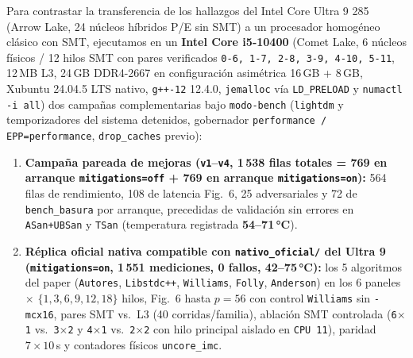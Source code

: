 \documentclass[11pt,a4paper]{article}
\begin{document}
Para contrastar la transferencia de los hallazgos del Intel Core Ultra 9 285 (Arrow Lake, 24 núcleos híbridos P/E sin SMT) a un procesador homogéneo clásico con SMT, ejecutamos en un \textbf{Intel Core i5-10400} (Comet Lake, 6 núcleos físicos / 12 hilos SMT con pares verificados \texttt{0-6, 1-7, 2-8, 3-9, 4-10, 5-11}, 12\,MB L3, 24\,GB DDR4-2667 en configuración asimétrica 16\,GB + 8\,GB, Xubuntu 24.04.5 LTS nativo, \texttt{g++-12} 12.4.0, \texttt{jemalloc} vía \texttt{LD\_PRELOAD} y \texttt{numactl -i all}) dos campañas complementarias bajo \texttt{modo-bench} (\texttt{lightdm} y temporizadores del sistema detenidos, gobernador \texttt{performance / EPP=performance}, \texttt{drop\_caches} previo):
\begin{enumerate}
  \item \textbf{Campaña pareada de mejoras (\texttt{v1}--\texttt{v4}, 1\,538 filas totales = 769 en arranque \texttt{mitigations=off} + 769 en arranque \texttt{mitigations=on}):} 564 filas de rendimiento, 108 de latencia Fig.~6, 25 adversariales y 72 de \texttt{bench\_basura} por arranque, precedidas de validación sin errores en \texttt{ASan+UBSan} y \texttt{TSan} (temperatura registrada \textbf{54--71\,°C}).
  \item \textbf{Réplica oficial nativa compatible con \texttt{nativo\_oficial/} del Ultra 9 (\texttt{mitigations=on}, 1\,551 mediciones, 0 fallos, 42--75\,°C):} los 5 algoritmos del paper (\texttt{Autores}, \texttt{Libstdc++}, \texttt{Williams}, \texttt{Folly}, \texttt{Anderson}) en los 6 paneles $\times$ $\{1, 3, 6, 9, 12, 18\}$ hilos, Fig.~6 hasta $p=56$ con control \texttt{Williams} sin \texttt{-mcx16}, pares SMT vs.\ L3 (40 corridas/familia), ablación SMT controlada (\texttt{6$\times$1} vs.\ \texttt{3$\times$2} y \texttt{4$\times$1} vs.\ \texttt{2$\times$2} con hilo principal aislado en \texttt{CPU 11}), paridad $7\times 10$\,s y contadores físicos \texttt{uncore\_imc}.
\end{enumerate}
\end{document}
